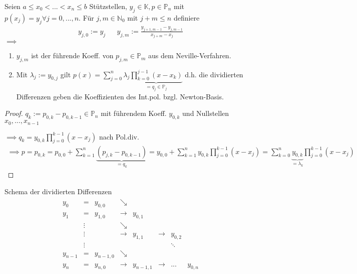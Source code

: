 \begin{theorem}
	Seien $a \leq x_0 < ... < x_n \leq b$ Stützstellen, $y_j \in \mathbb{K}, p \in \mathbb{P}_n$ mit $p(x_j) = y_j \forall j=0, ..., n$. Für $j, m \in \mathbb{N}_0$ mit $j+m \leq n$ definiere
	\begin{align*}
		y_{j,0} := y_j && y_{j,m} := \frac{y_{j+1,m-1}-y_{j,m-1}}{x_{j+m}-x_j}
	\end{align*}
	$\implies$
	\begin{enumerate}
		\item $y_{j,m}$ ist der führende Koeff. von $p_{j,m} \in \mathbb{P}_m$ aus dem Neville-Verfahren.
		\item Mit $\lambda_j := y_{0,j}$ gilt $p(x) = \sum_{j=0}^{n} \lambda_j \underbrace{\prod_{k=0}^{j-1}(x-x_k)}_{=q_j \in \mathbb{P}_j}$ d.h. die dividierten Differenzen geben die Koeffizienten des Int.pol. bzgl. Newton-Basis.
	\end{enumerate}	
\end{theorem}

\begin{proof}
	$q_k := p_{0,k} - p_{0,k-1} \in \mathbb{P}_n$ mit führendem Koeff. $y_{0,k}$ und Nullstellen $x_0, ..., x_{n-1}$
	
	$\implies q_k = y_{0,k} \prod_{j=0}^{k-1}(x-x_j)$ nach Pol.div.
	\begin{align*}
		\implies p = p_{0,k} = p_{0,0} + \sum_{k=1}^{n} \underbrace{(p_{j,k} - p_{0,k-1})}_{=q_k} = y_{0,0} + \sum_{k=1}^{n} y_{0,k} \prod_{j=0}^{k-1} (x-x_j) = \sum_{k=0}^{n} \underbrace{y_{0,k}}_{=\lambda_k} \prod_{j=0}^{k-1} (x-x_j)
	\end{align*}
\end{proof}

Schema der dividierten Differenzen
\begin{align*}
	\begin{matrix}
		y_0 &=      & y_{0,0} & \searrow & & & \\
		y_1 &=      & y_{1,0} & \rightarrow & y_{0,1} & & \\
		    &\vdots &         & \searrow & & & \\
		    &\vdots &         & \rightarrow & y_{1,1} & \rightarrow & y_{0,2} \\
		    &\vdots &         &            & &  &\ddots\\
		y_{n-1} &=  & y_{n-1,0} & \searrow & & & \\
		y_n &=      & y_{n,0} & \rightarrow & y_{n-1,1} & \rightarrow & ... & y_{0,n}\\
	\end{matrix}
\end{align*}

